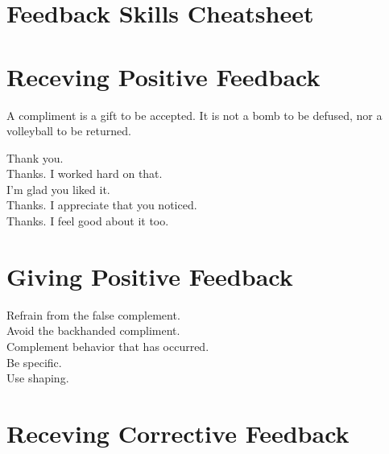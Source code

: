 \documentclass{article}
\begin{document}
\section*{Feedback Skills Cheatsheet}

\begin{multicols}{3}

	\section*{Receving Positive Feedback}

        A compliment is a gift to be accepted. It is not a bomb to be defused, nor a volleyball to be returned.

        \begin{description}
            \item[Thank you.]
            \item[Thanks. I worked hard on that.]
            \item[I'm glad you liked it.]
            \item[Thanks. I appreciate that you noticed.]
            \item[Thanks. I feel good about it too.]
        \end{description}

	\section*{Giving Positive Feedback}

        \begin{description}
            \item[Refrain from the false complement.]
            \item[Avoid the backhanded compliment.]
            \item[Complement behavior that has occurred.]
            \item[Be specific.]
            \item[Use shaping.]
        \end{description}

	\section*{Receving Corrective Feedback}


\end{multicols}
\end{document}
